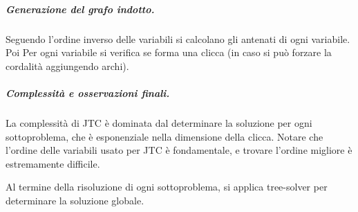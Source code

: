 \documentclass[a4paper, 11pt]{article}
\begin{document}
\subparagraph{Generazione del grafo indotto.} Seguendo l'ordine inverso delle variabili si calcolano gli antenati di ogni variabile. Poi Per ogni variabile si verifica se forma una clicca (in caso si può forzare la cordalità aggiungendo archi).

\subparagraph{Complessità e osservazioni finali.} La complessità di JTC è dominata dal determinare la soluzione per ogni sottoproblema, che è esponenziale nella dimensione della clicca. Notare che l'ordine delle variabili usato per JTC è fondamentale, e trovare l'ordine migliore è estremamente difficile.

Al termine della risoluzione di ogni sottoproblema, si applica tree-solver per determinare la soluzione globale.
\end{document}
